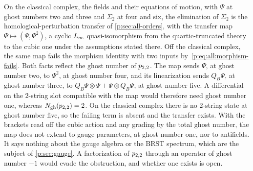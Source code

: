 On the classical complex, the fields and their equations of motion, with $\Psi$ at ghost numbers two and three and $\Sigma_2$ at four and six, the elimination of $\Sigma_2$ is the homological-perturbation transfer of \cref{p:sec:all-orders}, with the transfer map $\Psi \mapsto (\Psi, \Psi^2)$, a cyclic $L_\infty$ quasi-isomorphism from the quartic-truncated theory to the cubic one under the assumptions stated there.
  Off the classical complex, the same map fails the morphism identity with two inputs by~\eqref{p:eq:all:morphism-fails}.
  Both facts reflect the ghost number of $p_{2,2}$.
  The map sends $\Psi$, at ghost number two, to $\Psi^2$, at ghost number four, and its linearization sends $Q_B \Psi$, at ghost number three, to $Q_B \Psi \otimes \Psi + \Psi \otimes Q_B \Psi$, at ghost number five.
  A differential on the $2$-string slot compatible with the map would therefore need ghost number one, whereas $N_{\text{gh}}(p_{2,2}) = 2$.
  On the classical complex there is no $2$-string state at ghost number five, so the failing term is absent and the transfer exists.
  With the brackets read off the cubic action and any grading by the total ghost number, the map does not extend to gauge parameters, at ghost number one, nor to antifields.
  It says nothing about the gauge algebra or the BRST spectrum, which are the subject of \cref{p:sec:gauge}.
  A factorization of $p_{2,2}$ through an operator of ghost number $-1$ would evade the obstruction, and whether one exists is open.

